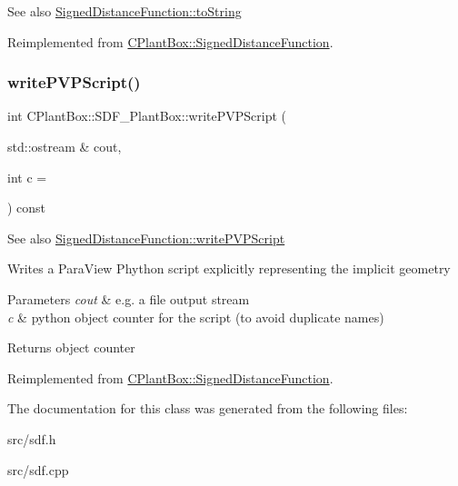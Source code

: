 \begin{DoxySeeAlso}{See also}
\hyperlink{classCPlantBox_1_1SignedDistanceFunction_a9f375961d9a24b06dc669ac67aa16fa6}{Signed\+Distance\+Function\+::to\+String} 
\end{DoxySeeAlso}


Reimplemented from \hyperlink{classCPlantBox_1_1SignedDistanceFunction_a9f375961d9a24b06dc669ac67aa16fa6}{C\+Plant\+Box\+::\+Signed\+Distance\+Function}.

\mbox{\label{classCPlantBox_1_1SDF__PlantBox_a077239ab725f28c5a85e0e27749cc532}} 
\subsubsection{\texorpdfstring{write\+P\+V\+P\+Script()}{writePVPScript()}}
{\footnotesize\ttfamily int C\+Plant\+Box\+::\+S\+D\+F\+\_\+\+Plant\+Box\+::write\+P\+V\+P\+Script (\begin{DoxyParamCaption}\item[{std\+::ostream \&}]{cout,  }\item[{int}]{c = {} }\end{DoxyParamCaption}) const\hspace{0.3cm}{\ttfamily [virtual]}}

\begin{DoxySeeAlso}{See also}
\hyperlink{classCPlantBox_1_1SignedDistanceFunction_a0098fb469c9be5557d5593cec9e76d2a}{Signed\+Distance\+Function\+::write\+P\+V\+P\+Script}
\end{DoxySeeAlso}
Writes a Para\+View Phython script explicitly representing the implicit geometry


\begin{DoxyParams}{Parameters}
{\em cout} & e.\+g. a file output stream \\
\hline
{\em c} & python object counter for the script (to avoid duplicate names) \\
\hline
\end{DoxyParams}
\begin{DoxyReturn}{Returns}
object counter 
\end{DoxyReturn}


Reimplemented from \hyperlink{classCPlantBox_1_1SignedDistanceFunction_a0098fb469c9be5557d5593cec9e76d2a}{C\+Plant\+Box\+::\+Signed\+Distance\+Function}.



The documentation for this class was generated from the following files\+:\begin{DoxyCompactItemize}
\item 
src/sdf.\+h\item 
src/sdf.\+cpp\end{DoxyCompactItemize}
